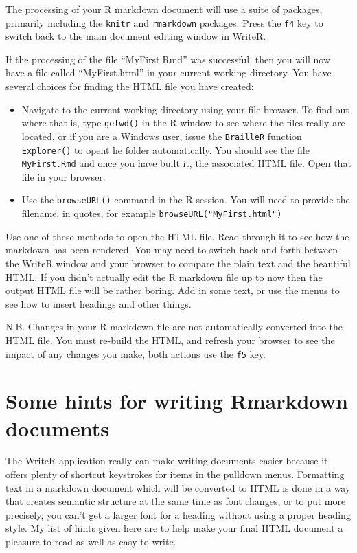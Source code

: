 \documentclass[
]{book}
\providecommand{\tightlist}{%
  \setlength{\itemsep}{0pt}\setlength{\parskip}{0pt}}
\begin{document}
The processing of your R markdown document will use a suite of packages, primarily including the \texttt{knitr} \citep{Rpkg-knitr} and \texttt{rmarkdown} \citep{Rpkg-rmarkdown} packages.
Press the \texttt{f4} key to switch back to the main document editing window in WriteR.

If the processing of the file ``MyFirst.Rmd'' was successful, then you will now have a file called ``MyFirst.html'' in your current working directory. You have several choices for finding the HTML file you have created:

\begin{itemize}
\tightlist
\item
  Navigate to the current working directory using your file browser. To find out where that is, type \texttt{getwd()} in the R window to see where the files really are located, or if you are a Windows user, issue the \texttt{BrailleR} function \texttt{Explorer()} to opent he folder automatically.
  You should see the file \texttt{MyFirst.Rmd} and once you have built it, the associated HTML file. Open that file in your browser.
\item
  Use the \texttt{browseURL()} command in the R session. You will need to provide the filename, in quotes, for example \texttt{browseURL("MyFirst.html")}
\end{itemize}

Use one of these methods to open the HTML file. Read through it to see how the markdown has been rendered.
You may need to switch back and forth between the WriteR window and your browser to compare the plain text and the beautiful HTML. If you didn't actually edit the R markdown file up to now then the output HTML file will be rather boring. Add in some text, or use the menus to see how to insert headings and other things.

N.B. Changes in your R markdown file are not automatically converted into the HTML file. You must re-build the HTML, and refresh your browser to see the impact of any changes you make, both actions use the \texttt{f5} key.

\hypertarget{some-hints-for-writing-rmarkdown-documents}{%
\section{Some hints for writing Rmarkdown documents}\label{some-hints-for-writing-rmarkdown-documents}}

The WriteR application really can make writing documents easier because it offers plenty of shortcut keystrokes for items in the pulldown menus. Formatting text in a markdown document which will be converted to HTML is done in a way that creates semantic structure at the same time as font changes, or to put more precisely, you can't get a larger font for a heading without using a proper heading style. My list of hints given here are to help make your final HTML document a pleasure to read as well as easy to write.
\end{document}
